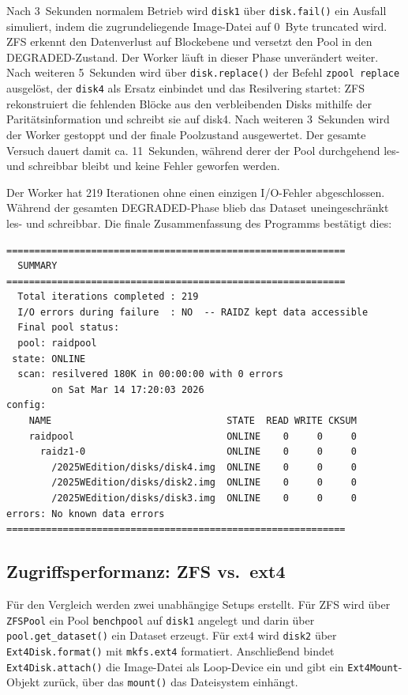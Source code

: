 \documentclass[a4paper, 12pt]{article}
\begin{document}
Nach 3~Sekunden normalem Betrieb wird \texttt{disk1} über \texttt{disk.fail()} ein Ausfall simuliert, indem die zugrundeliegende Image-Datei auf 0~Byte truncated wird. ZFS erkennt den Datenverlust auf Blockebene und versetzt den Pool in den DEGRADED-Zustand. Der Worker läuft in dieser Phase unverändert weiter. Nach weiteren 5~Sekunden wird über \texttt{disk.replace()} der Befehl \texttt{zpool replace} ausgelöst, der \texttt{disk4} als Ersatz einbindet und das Resilvering startet: ZFS rekonstruiert die fehlenden Blöcke aus den verbleibenden Disks mithilfe der Paritätsinformation und schreibt sie auf disk4. Nach weiteren 3~Sekunden wird der Worker gestoppt und der finale Poolzustand ausgewertet. Der gesamte Versuch dauert damit ca. 11~Sekunden, während derer der Pool durchgehend les- und schreibbar bleibt und keine Fehler geworfen werden.

Der Worker hat 219 Iterationen ohne einen einzigen I/O-Fehler abgeschlossen. Während der gesamten DEGRADED-Phase blieb das Dataset uneingeschränkt les- und schreibbar. Die finale Zusammenfassung des Programms bestätigt dies:

\begin{lstlisting}
============================================================
  SUMMARY
============================================================
  Total iterations completed : 219
  I/O errors during failure  : NO  -- RAIDZ kept data accessible
  Final pool status:
  pool: raidpool
 state: ONLINE
  scan: resilvered 180K in 00:00:00 with 0 errors
        on Sat Mar 14 17:20:03 2026
config:
    NAME                               STATE  READ WRITE CKSUM
    raidpool                           ONLINE    0     0     0
      raidz1-0                         ONLINE    0     0     0
        /2025WEdition/disks/disk4.img  ONLINE    0     0     0
        /2025WEdition/disks/disk2.img  ONLINE    0     0     0
        /2025WEdition/disks/disk3.img  ONLINE    0     0     0
errors: No known data errors
============================================================
\end{lstlisting}

\subsection{Zugriffsperformanz: ZFS vs.\ ext4}

Für den Vergleich werden zwei unabhängige Setups erstellt. Für ZFS wird über \texttt{ZFSPool} ein Pool \texttt{benchpool} auf \texttt{disk1} angelegt und darin über \texttt{pool.get\_dataset()} ein Dataset erzeugt. Für ext4 wird \texttt{disk2} über \texttt{Ext4Disk.format()} mit \texttt{mkfs.ext4} formatiert. Anschließend bindet \texttt{Ext4Disk.attach()} die Image-Datei als Loop-Device ein und gibt ein \texttt{Ext4Mount}-Objekt zurück, über das \texttt{mount()} das Dateisystem einhängt.
\end{document}
